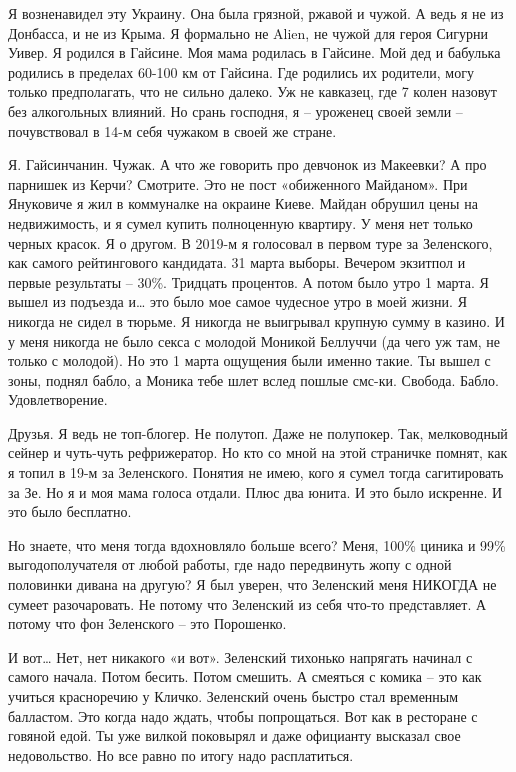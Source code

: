 Я возненавидел эту Украину. Она была грязной, ржавой и чужой. А ведь я не из
Донбасса, и не из Крыма. Я формально не Alien, не чужой для героя Сигурни
Уивер. Я родился в Гайсине. Моя мама родилась в Гайсине. Мой дед и бабулька
родились в пределах 60-100 км от Гайсина. Где родились их родители, могу только
предполагать, что не сильно далеко. Уж не кавказец, где 7 колен назовут без
алкогольных влияний. Но срань господня, я – уроженец своей земли – почувствовал
в 14-м себя чужаком в своей же стране.

Я. Гайсинчанин. Чужак. А что же говорить про девчонок из Макеевки? А про парнишек из Керчи?
Смотрите. Это не пост «обиженного Майданом». При Януковиче я жил в коммуналке на окраине Киеве. Майдан обрушил цены на недвижимость, и я сумел купить полноценную квартиру. У меня нет только черных красок. Я о другом.
В 2019-м я голосовал в первом туре за Зеленского, как самого рейтингового
кандидата. 31 марта выборы. Вечером экзитпол и первые результаты – 30\%.
Тридцать процентов. А потом было утро 1 марта. Я вышел из подъезда и… это было
мое самое чудесное утро в моей жизни. Я никогда не сидел в тюрьме. Я никогда не
выигрывал крупную сумму в казино. И у меня никогда не было секса с молодой
Моникой Беллуччи (да чего уж там, не только с молодой). Но это 1 марта ощущения
были именно такие. Ты вышел с зоны, поднял бабло, а Моника тебе шлет вслед
пошлые смс-ки. Свобода. Бабло. Удовлетворение.

Друзья. Я ведь не топ-блогер. Не полутоп. Даже не полупокер. Так, мелководный сейнер и чуть-чуть рефрижератор. Но кто со мной на этой страничке помнят, как я топил в 19-м за Зеленского. Понятия не имею, кого я сумел тогда сагитировать за Зе. Но я и моя мама голоса отдали. Плюс два юнита. И это было искренне. И это было бесплатно.

Но знаете, что меня тогда вдохновляло больше всего? Меня, 100\% циника и 99\%
выгодополучателя от любой работы, где надо передвинуть жопу с одной половинки
дивана на другую? Я был уверен, что Зеленский меня НИКОГДА не сумеет
разочаровать. Не потому что Зеленский из себя что-то представляет. А потому что
фон Зеленского – это Порошенко.

И вот… Нет, нет никакого «и вот». Зеленский тихонько напрягать начинал с самого
начала. Потом бесить. Потом смешить. А смеяться с комика – это как учиться
красноречию у Кличко. Зеленский очень быстро стал временным балластом. Это
когда надо ждать, чтобы попрощаться. Вот как в ресторане с говяной едой. Ты уже
вилкой поковырял и даже официанту высказал свое недовольство. Но все равно по
итогу надо расплатиться.

